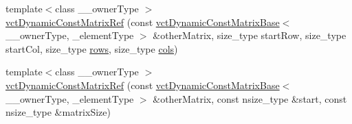 {\bf }\par
\begin{DoxyCompactItemize}
\item 
{\footnotesize template$<$class \-\_\-\-\_\-owner\-Type $>$ }\\\hyperlink{classvct_dynamic_const_matrix_ref_ae25ab4bdd7ef6a015128445886601545}{vct\-Dynamic\-Const\-Matrix\-Ref} (const \hyperlink{classvct_dynamic_const_matrix_base}{vct\-Dynamic\-Const\-Matrix\-Base}$<$ \-\_\-\-\_\-owner\-Type, \-\_\-element\-Type $>$ \&other\-Matrix, size\-\_\-type start\-Row, size\-\_\-type start\-Col, size\-\_\-type \hyperlink{classvct_dynamic_const_matrix_base_a5eac13be2207ebeb8766cde379d73438}{rows}, size\-\_\-type \hyperlink{classvct_dynamic_const_matrix_base_aa6c51d41a100da49a7e7ac7edb20ecd9}{cols})
\item 
{\footnotesize template$<$class \-\_\-\-\_\-owner\-Type $>$ }\\\hyperlink{classvct_dynamic_const_matrix_ref_acb86d5a9ab887009576c09c2558adfa4}{vct\-Dynamic\-Const\-Matrix\-Ref} (const \hyperlink{classvct_dynamic_const_matrix_base}{vct\-Dynamic\-Const\-Matrix\-Base}$<$ \-\_\-\-\_\-owner\-Type, \-\_\-element\-Type $>$ \&other\-Matrix, const nsize\-\_\-type \&start, const nsize\-\_\-type \&matrix\-Size)
\end{DoxyCompactItemize}

